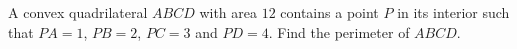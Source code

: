A convex quadrilateral $ABCD$ with area $12$ contains a point $P$ in its interior such that $PA=1$, $PB=2$, $PC=3$ and $PD=4$. Find the perimeter of $ABCD$.
